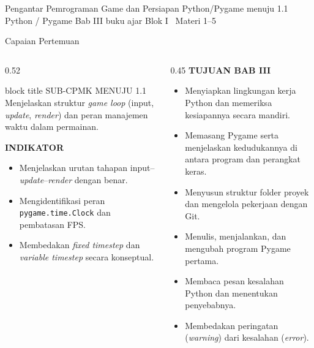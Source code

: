 \documentclass[aspectratio=169,10pt]{beamer}
\begin{document}
  {Pengantar Pemrograman Game dan Persiapan Python/Pygame}
  {menuju 1.1}
  {Python / Pygame}
  {Bab III buku ajar}
  {Blok I \textperiodcentered\ Materi 1--5}

\begin{frame}{Capaian Pertemuan}
\begin{columns}[T,onlytextwidth]
  \begin{column}{0.52\textwidth}
    \begin{beamercolorbox}[wd=\linewidth,sep=5pt,rounded=true]{block title}
      {\fontsize{6.8}{8}\selectfont\color{ubHead}SUB-CPMK MENUJU 1.1}\\[2pt]
      {\footnotesize Menjelaskan struktur \emph{game loop} (input,
       \emph{update}, \emph{render}) dan peran manajemen waktu dalam
       permainan.}
    \end{beamercolorbox}
    \vspace{0.16cm}

    {\fontsize{7}{8.5}\selectfont\bfseries\color{ubAccent}INDIKATOR}\par
    \vspace{0.06cm}
    \begin{itemize}
      \item Menjelaskan urutan tahapan input--\emph{update}--\emph{render}
            dengan benar.
      \item Mengidentifikasi peran \texttt{pygame.time.Clock} dan pembatasan
            FPS.
      \item Membedakan \emph{fixed timestep} dan \emph{variable timestep}
            secara konseptual.
    \end{itemize}
  \end{column}
  \begin{column}{0.45\textwidth}
    {\fontsize{7}{8.5}\selectfont\bfseries\color{ubAccent}TUJUAN BAB III}\par
    \vspace{0.08cm}
    \begin{itemize}
      \item Menyiapkan lingkungan kerja Python dan memeriksa kesiapannya
            secara mandiri.
      \item Memasang Pygame serta menjelaskan kedudukannya di antara program
            dan perangkat keras.
      \item Menyusun struktur folder proyek dan mengelola pekerjaan dengan
            Git.
      \item Menulis, menjalankan, dan mengubah program Pygame pertama.
      \item Membaca pesan kesalahan Python dan menentukan penyebabnya.
      \item Membedakan peringatan (\emph{warning}) dari kesalahan
            (\emph{error}).
    \end{itemize}
  \end{column}
\end{columns}
\end{frame}
\end{document}
